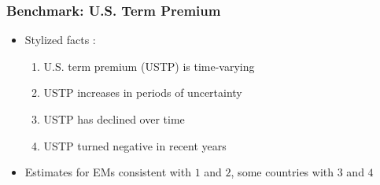 \documentclass[12pt, aspectratio=169, xcolor=dvipsnames]{beamer}  %
\begin{document}
\begin{frame}
	\frametitle{Benchmark: U.S. Term Premium}
	\begin{itemize}
		\item Stylized facts \citep*{KimWright:2005, ACM:2013}:
		\begin{enumerate}
			\item U.S. term premium (USTP) is time-varying
			\item USTP increases in periods of uncertainty
			\item USTP has declined over time
			\item USTP turned negative in recent years
		\end{enumerate}
		\item Estimates for EMs consistent with $1$ and $2$, some countries with $3$ and $4$
	\end{itemize}
\end{frame}
\end{document}
